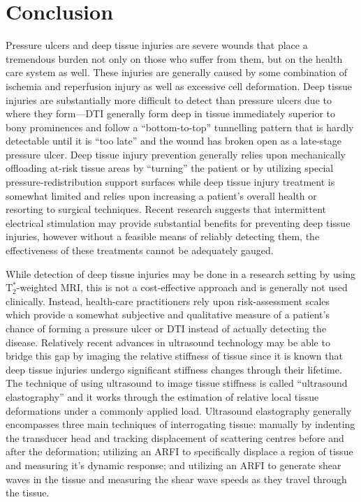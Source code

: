 	\section{Conclusion}
		Pressure ulcers and deep tissue injuries are severe wounds that place a tremendous burden not only on those who suffer from them, but on the health care system as well. These injuries are generally caused by some combination of ischemia and reperfusion injury as well as excessive cell deformation. Deep tissue injuries are substantially more difficult to detect than pressure ulcers due to where they form---DTI generally form deep in tissue immediately superior to bony prominences and follow a ``bottom-to-top'' tunnelling pattern that is hardly detectable until it is ``too late'' and the wound has broken open as a late-stage pressure ulcer. Deep tissue injury prevention generally relies upon mechanically offloading at-risk tissue areas by ``turning'' the patient or by utilizing special pressure-redistribution support surfaces while deep tissue injury treatment is somewhat limited and relies upon increasing a patient's overall health or resorting to surgical techniques. Recent research suggests that intermittent electrical stimulation may provide substantial benefits for preventing deep tissue injuries, however without a feasible means of reliably detecting them, the effectiveness of these treatments cannot be adequately gauged.

		While detection of deep tissue injuries may be done in a research setting by using $\mathrm{T}_2^*$-weighted MRI, this is not a cost-effective approach and is generally not used clinically. Instead, health-care practitioners rely upon risk-assessment scales which provide a somewhat subjective and qualitative measure of a patient's chance of forming a pressure ulcer or DTI instead of actually detecting the disease. Relatively recent advances in ultrasound technology may be able to bridge this gap by imaging the relative stiffness of tissue since it is known that deep tissue injuries undergo significant stiffness changes through their lifetime. The technique of using ultrasound to image tissue stiffness is called ``ultrasound elastography'' and it works through the estimation of relative local tissue deformations under a commonly applied load. Ultrasound elastography generally encompasses three main techniques of interrogating tissue: manually by indenting the transducer head and tracking displacement of scattering centres before and after the deformation; utilizing an ARFI to specifically displace a region of tissue and measuring it's dynamic response; and utilizing an ARFI to generate shear waves in the tissue and measuring the shear wave speeds as they travel through the tissue.

